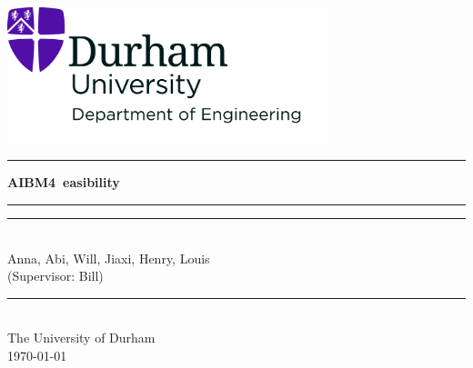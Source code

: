 \documentclass[12pt]{article}
\begin{document}

\begin{titlepage}                                             %
\pagestyle{empty}                                             %
\centering                                                    %
\includegraphics[width=0.7\textwidth]{UoD_Engineering.jpg} \\  
\vspace{60mm}                                                 %
\hrule\vspace{5mm}                                       %
 
{\LARGE \textbf{\textcolor{mygreen}{AIBM4\ easibility\report}}} \\[5pt] %


\vspace{5mm}\hrule\vspace{20mm}                               %
\noindent\rule{\textwidth}{1pt} \\[10pt]  %

{\large Anna, Abi, Will, Jiaxi, Henry, Louis} \\ \vspace{2mm} %
{\large (Supervisor: Bill)} \\[10pt] %
\noindent\rule{\textwidth}{1pt} \\  %

\vfill                                                        %
{\small The University of Durham \\ \today}                %
\cleardoublepage                                              %
\end{titlepage}
\end{document}
